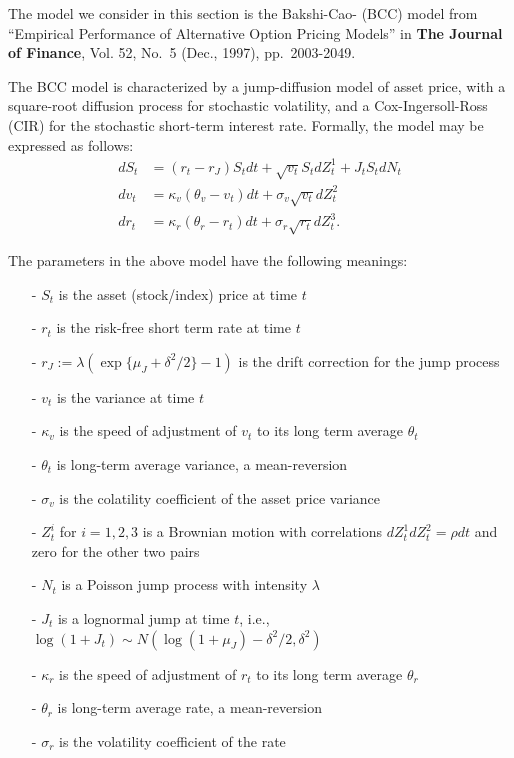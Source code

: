 \documentclass[
]{book}
\begin{document}
The model we consider in this section is the Bakshi-Cao- (BCC) model from ``Empirical Performance of Alternative Option Pricing Models'' in \textbf{The Journal of Finance}, Vol. 52, No.~5 (Dec., 1997), pp.~2003-2049.

The BCC model is characterized by a jump-diffusion model of asset price, with a square-root diffusion process for stochastic volatility, and a Cox-Ingersoll-Ross (CIR) for the stochastic short-term interest rate. Formally, the model may be expressed as follows:
\begin{align*}
dS_t &= (r_t - r_J)S_tdt + \sqrt{v_t}S_tdZ_t^1 + J_tS_tdN_t\\
dv_t &= \kappa_v(\theta_v - v_t)dt + \sigma_v\sqrt{v_t}dZ_t^2\\
dr_t &= \kappa_r(\theta_r - r_t)dt + \sigma_r\sqrt{r_t}dZ_t^3.
\end{align*}

The parameters in the above model have the following meanings:

\begin{itemize}
\item[-] $S_t$ is the asset (stock/index) price at time $t$
\item[-] $r_t$ is the risk-free short term rate at time $t$
\item[-] $r_J:=\lambda(\exp\{\mu_J + \delta^2/2\}-1)$ is the drift correction for the jump process
\item[-] $v_t$ is the variance at time $t$
\item[-] $\kappa_v$ is the speed of adjustment of $v_t$ to its long term average $\theta_t$
\item[-] $\theta_t$ is long-term average variance, a mean-reversion
\item[-] $\sigma_v$ is the colatility coefficient of the asset price variance
\item[-] $Z_t^i$ for $i=1,2,3$ is a Brownian motion with correlations $dZ_t^1dZ_t^2 = \rho dt$ and zero for the other two pairs
\item[-] $N_t$ is a Poisson jump process with intensity $\lambda$
\item[-] $J_t$ is a lognormal jump at time $t$, i.e., $\log(1+J_t)\sim N(\log(1+\mu_J)-\delta^2/2, \delta^2)$  
\item[-] $\kappa_r$ is the speed of adjustment of $r_t$ to its long term average $\theta_r$
\item[-] $\theta_r$ is long-term average rate, a mean-reversion
\item[-] $\sigma_r$ is the volatility coefficient of the rate 
\end{itemize}
\end{document}
